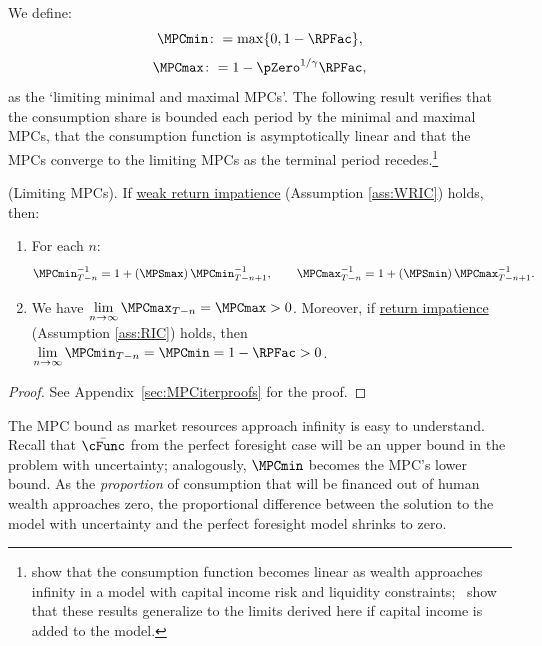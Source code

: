 \documentclass[\econtexRoot/BufferStockTheory]{subfiles}
\begin{document}

We define:
%
\hypertarget{MPCmaxDefn}{}\hypertarget{MPCminDefn}{}
\begin{equation}
\MPCmin \colon = \max\{0,1- \RPFac\}, \label{eq:MPCminDefn}
\end{equation}
\begin{equation}
\MPCmax \colon = 1 - \pZero^{1/\gamma}\RPFac, \label{eq:MPCmaxDefn}
\end{equation}
as the `limiting minimal and maximal MPCs'.
The following result verifies that the consumption share is bounded each period by the minimal and maximal MPCs, that the consumption function is asymptotically linear and that the MPCs converge to the limiting MPCs as the terminal period recedes.\footnote{\cite{benhabibWealth} show that the consumption function becomes linear as wealth approaches infinity in a model with capital income risk and liquidity constraints;~\cite{maTodaRich} show that these results generalize to the limits derived here if capital income is added to the model.} 
\hypertarget{cFuncBounds}{}

\begin{lemma}(Limiting MPCs).
\label{lemm:MPC}
If \hyperlink{WRIC}{weak return impatience} (Assumption \ref{ass:WRIC}) holds, then:

\begin{enumerate}[label=(\roman*)]
\item For each $n$:
%
\begin{equation}\label{eq:MPCminInv}
\MPCmin_{T-n}^{-1}  = 1+\left(\MPSmax\right) \MPCmin_{T-n+1}^{-1}, \qquad \MPCmax_{T-n}^{-1}   = 1+\left(\MPSmin\right) \MPCmax_{T-n+1}^{-1}.
\end{equation}

\item  We have $\lim\limits_{n \rightarrow \infty }\MPCmax_{T-n} = \MPCmax>0$.
Moreover, if \hyperlink{RIC}{return impatience} (Assumption \ref{ass:RIC}) holds, then $\lim\limits_{n \rightarrow  \infty}\MPCmin_{T-n} = \MPCmin = 1- \RPFac>0$.

\end{enumerate}
\end{lemma}
\begin{proof}\let\qed\relax
  See Appendix~\ref{sec:MPCiterproofs} for the proof.

  \end{proof}

The MPC bound as market resources approach infinity is easy to understand.
Recall that $\bar{\cFunc}$ from the perfect foresight case will be an upper bound in the problem with uncertainty; analogously, $\MPCmin$ becomes the MPC's lower bound.
As the \textit{proportion} of consumption that will be financed out of human wealth approaches zero, the proportional difference between the solution to the model with uncertainty and the perfect foresight model shrinks to zero.
\end{document}
